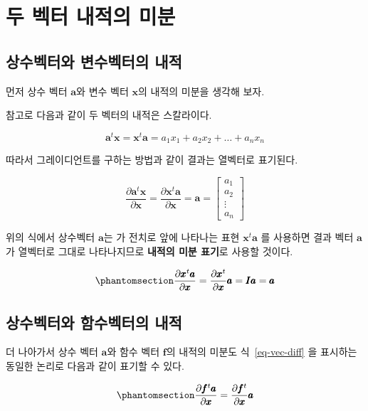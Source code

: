 \documentclass[
  11pt,
  a4paper,
  oneside]{scrbook}
\newcommand{\pardifftwo}[2]{\frac{\partial #1}{\partial #2 }}
\theoremstyle{definition}
\theoremstyle{plain}
\theoremstyle{definition}
\theoremstyle{definition}
\theoremstyle{remark}
\begin{document}
\section{두 벡터 내적의
미분}\label{uxb450-uxbca1uxd130-uxb0b4uxc801uxc758-uxbbf8uxbd84}

\subsection{상수벡터와 변수벡터의
내적}\label{uxc0c1uxc218uxbca1uxd130uxc640-uxbcc0uxc218uxbca1uxd130uxc758-uxb0b4uxc801}

먼저 상수 벡터 \(\pmb a\)와 변수 벡터 \(\pmb x\)의 내적의 미분을 생각해
보자.

참고로 다음과 같이 두 벡터의 내적은 스칼라이다.

\[ \pmb a^t \pmb x = \pmb x^t \pmb a = a_1 x_1 + a_2x_2 + \dots + a_n x_n \]

따라서 그레이디언트를 구하는 방법과 같이 결과는 열벡터로 표기된다.

\[
\pardifftwo{ \pmb a^t \pmb x}{\pmb x} = \pardifftwo{ \pmb x^t \pmb a}{\pmb x} = \pmb a =
\begin{bmatrix}
a_1 \\ 
a_2\\ 
\vdots \\
 a_n
\end{bmatrix}
\]

위의 식에서 상수벡터 \(\pmb a\)는 가 전치로 앞에 나타나는 표현
\(\pmb x^t \pmb a\) 를 사용하면 결과 벡터 \(\pmb a\)가 열벡터로 그대로
나타나지므로 \textbf{내적의 미분 표기}로 사용할 것이다.

\begin{equation}\phantomsection\label{eq-vec-diff}{ 
\pardifftwo{ \pmb x^t \pmb a}{\pmb x} =  \pardifftwo{  \pmb x^t}{\pmb x} \pmb a =\pmb I  \pmb a = \pmb a 
}\end{equation}

\subsection{상수벡터와 함수벡터의
내적}\label{uxc0c1uxc218uxbca1uxd130uxc640-uxd568uxc218uxbca1uxd130uxc758-uxb0b4uxc801}

더 나아가서 상수 벡터 \(\pmb a\)와 함수 벡터 \(\pmb f\)의 내적의 미분도
식~\ref{eq-vec-diff} 을 표시하는 동일한 논리로 다음과 같이 표기할 수
있다.

\begin{equation}\phantomsection\label{eq-vec-diff-0}{ 
\pardifftwo{ \pmb f^t \pmb a}{\pmb x} =  \pardifftwo{  \pmb f^t}{\pmb x} \pmb a
}\end{equation}
\end{document}
